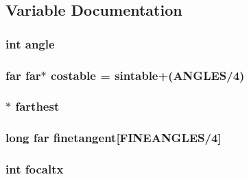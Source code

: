 \subsection{Variable Documentation}
\hypertarget{WL__DRAW_8C_a63177970cacb40efba67ce501ea89210}{
\subsubsection[{angle}]{\setlength{\rightskip}{0pt plus 5cm}int {\bf angle}}}
\label{WL__DRAW_8C_a63177970cacb40efba67ce501ea89210}
\hypertarget{WL__DRAW_8C_af8ca9927f66a9bc35f3b160229131e1d}{
\subsubsection[{costable}]{ far far$\ast$ {\bf costable} = {\bf sintable}+(ANGLES/4)}}
\label{WL__DRAW_8C_af8ca9927f66a9bc35f3b160229131e1d}
\hypertarget{WL__DRAW_8C_ad309c8f7ec06b57630f2cc2cc9d67570}{
\subsubsection[{farthest}]{ $\ast$ {\bf farthest}}}
\label{WL__DRAW_8C_ad309c8f7ec06b57630f2cc2cc9d67570}
\hypertarget{WL__DRAW_8C_affbee62526a1ad946f1d5c2b2c26331b}{
\subsubsection[{finetangent}]{\setlength{\rightskip}{0pt plus 5cm}long far {\bf finetangent}\mbox{[}FINEANGLES/4\mbox{]}}}
\label{WL__DRAW_8C_affbee62526a1ad946f1d5c2b2c26331b}
\hypertarget{WL__DRAW_8C_a2b4041cde019ba3febac8334f74e42c4}{
\subsubsection[{focaltx}]{\setlength{\rightskip}{0pt plus 5cm}int {\bf focaltx}}}
\label{WL__DRAW_8C_a2b4041cde019ba3febac8334f74e42c4}
